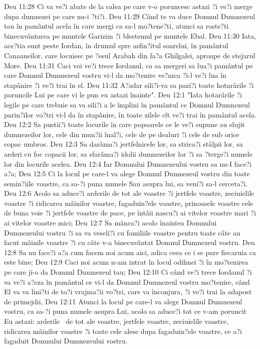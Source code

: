 Deu 11:28  Ci va ve?i abate de la calea pe care v-o poruncesc astazi ?i ve?i merge dupa dumnezei pe care nu-i ?ti?i.
Deu 11:29  Când te va duce Domnul Dumnezeul tau în pamântul acela în care mergi ca sa-l mo?tene?ti, atunci sa roste?ti binecuvântarea pe muntele Garizim ?i blestemul pe muntele Ebal.
Deu 11:30  Iata, ace?tia sunt peste Iordan, în drumul spre asfin?itul soarelui, în pamântul Canaaneilor, care locuiesc pe ?esul Arabah din fa?a Ghilgalei, aproape de stejarul More.
Deu 11:31  Caci voi ve?i trece Iordanul, ca sa mergeri sa lua?i pamântul pe care Domnul Dumnezeul vostru vi-l da mo?tenire ve?nica ?i-l ve?i lua în stapânire ?i ve?i trai în el.
Deu 11:32  A?adar sili?i-va sa pazi?i toate hotarârile ?i poruncile Lui pe care vi le pun eu astazi înainte".
Deu 12:1  "Iata hotarârile ?i legile pe care trebuie sa va sili?i a le împlini în pamântul ce Domnul Dumnezeul parin?ilor vo?tri vi-l da în stapânire, în toate zilele cît ve?i trai în pamântul acela.
Deu 12:2  Sa pustii?i toate locurile în care popoarele ce le ve?i supune au slujit dumnezeilor lor, cele din mun?ii înal?i, cele de pe dealuri ?i cele de sub orice copac umbros.
Deu 12:3  Sa darâma?i jertfelnicele lor, sa strica?i stâlpii lor, sa arderi cu foc copacii lor, sa sfarâma?i idolii dumnezeilor lor ?i sa ?terge?i numele lor din locurile acelea.
Deu 12:4  Iar Domnului Dumnezeului vostru sa nu-I face?i a?a;
Deu 12:5  Ci la locul pe care-l va alege Domnul Dumnezeul vostru din toate semin?iile voastre, ca sa-?i puna numele Sau asupra lui, sa veni?i sa-l cerceta?i.
Deu 12:6  Acolo sa aduce?i arderile de tot ale voastre ?i jertfele voastre, zeciuielile voastre ?i ridicarea mâinilor voastre, fagaduin?ele voastre, prinoasele voastre cele de buna voie ?i jertfele voastre de pace, pe întâii nascu?i ai vitelor voastre mari ?i ai vitelor voastre mici;
Deu 12:7  Sa mânca?i acolo înaintea Domnului Dumnezeului vostru ?i sa va veseli?i cu familiile voastre pentru toate câte au facut mâinile voastre ?i cu câte v-a binecuvântat Domnul Dumnezeul vostru.
Deu 12:8  Sa nu face?i a?a cum facem noi acum aici, adica ceea ce i se pare fiecaruia ca este bine;
Deu 12:9  Caci noi acum n-am intrat în locul odihnei ?i în mo?tenirea pe care ji-o da Domnul Dumnezeul tau;
Deu 12:10  Ci când ve?i trece Iordanul ?i va ve?i a?eza în pamântul ce vi-l da Domnul Dumnezeul vostru mo?tenire, când El va va lini?ti de to?i vrajma?ii vo?tri, care va înconjura, ?i ve?i trai la adapost de primejdii,
Deu 12:11  Atunci la locul pe care-l va alege Domnul Dumnezeul vostru, ca sa-?i puna numele asupra Lui, acolo sa aduce?i tot ce v-am poruncit Eu astazi: arderile  de tot ale voastre, jertfele voastre, zeciuielile voastre, ridicarea mâinilor voastre ?i toate cele alese dupa fagaduin?ele voastre, ce a?i fagaduit Domnului Dumnezeului vostru.
